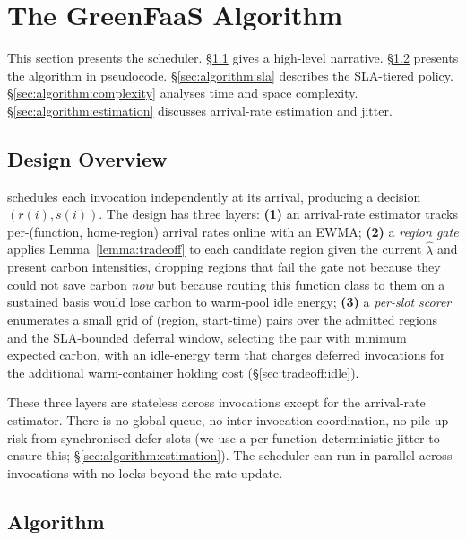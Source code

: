 \section{The GreenFaaS Algorithm}
\label{sec:algorithm}

This section presents the \GreenFaaS{} scheduler. \S\ref{sec:algorithm:design}
gives a high-level narrative. \S\ref{sec:algorithm:pseudocode} presents
the algorithm in pseudocode. \S\ref{sec:algorithm:sla} describes the
SLA-tiered policy. \S\ref{sec:algorithm:complexity} analyses time and
space complexity. \S\ref{sec:algorithm:estimation} discusses
arrival-rate estimation and jitter.

\subsection{Design Overview}
\label{sec:algorithm:design}

\GreenFaaS{} schedules each invocation independently at its arrival,
producing a decision $(r(i), s(i))$. The design has three layers:
\textbf{(1)} an arrival-rate estimator tracks per-(function,
home-region) arrival rates online with an EWMA; \textbf{(2)} a
\emph{region gate} applies Lemma~\ref{lemma:tradeoff} to each
candidate region given the current $\hat\lambda$ and present
carbon intensities, dropping regions that fail the gate not because
they could not save carbon \emph{now} but because routing this
function class to them on a sustained basis would lose carbon to
warm-pool idle energy; \textbf{(3)} a \emph{per-slot scorer}
enumerates a small grid of (region, start-time) pairs over the
admitted regions and the SLA-bounded deferral window, selecting the
pair with minimum expected carbon, with an idle-energy term that
charges deferred invocations for the additional warm-container
holding cost (\S\ref{sec:tradeoff:idle}).

These three layers are stateless across invocations except for the
arrival-rate estimator. There is no global queue, no
inter-invocation coordination, no pile-up risk from synchronised
defer slots (we use a per-function deterministic jitter to ensure
this; \S\ref{sec:algorithm:estimation}). The scheduler can run in
parallel across invocations with no locks beyond the rate update.

\subsection{Algorithm}
\label{sec:algorithm:pseudocode}

